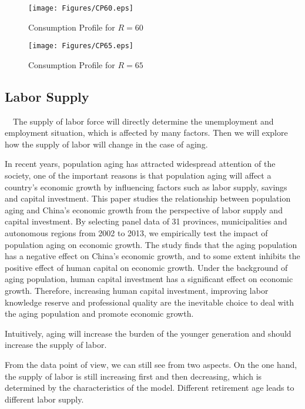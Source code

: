 \documentclass{article}
\begin{document}
        \begin{figure}[H]
            \centering
            \texttt{[image: Figures/CP60.eps]}
            \caption{Consumption Profile for $R=60$}
        \end{figure}

        \begin{figure}[H]
            \centering
            \texttt{[image: Figures/CP65.eps]}
            \caption{Consumption Profile for $R=65$}
        \end{figure}
        
    \subsection{Labor Supply}
        ~\
        The supply of labor force will directly determine the unemployment and employment situation, which is affected by many factors. Then we will explore how the supply of labor will change in the case of aging.
        
        In recent years, population aging has attracted widespread attention of the society, one of the important reasons is that population aging will affect a country's economic growth by influencing factors such as labor supply, savings and capital investment. This paper studies the relationship between population aging and China's economic growth from the perspective of labor supply and capital investment. By selecting panel data of 31 provinces, municipalities and autonomous regions from 2002 to 2013, we empirically test the impact of population aging on economic growth. The study finds that the aging population has a negative effect on China's economic growth, and to some extent inhibits the positive effect of human capital on economic growth. Under the background of aging population, human capital investment has a significant effect on economic growth. Therefore, increasing human capital investment, improving labor knowledge reserve and professional quality are the inevitable choice to deal with the aging population and promote economic growth.
        
        Intuitively, aging will increase the burden of the younger generation and should increase the supply of labor.

        
        From the data point of view, we can still see from two aspects. On the one hand, the supply of labor is still increasing first and then decreasing, which is determined by the characteristics of the model. Different retirement age leads to different labor supply.
        
\end{document}
